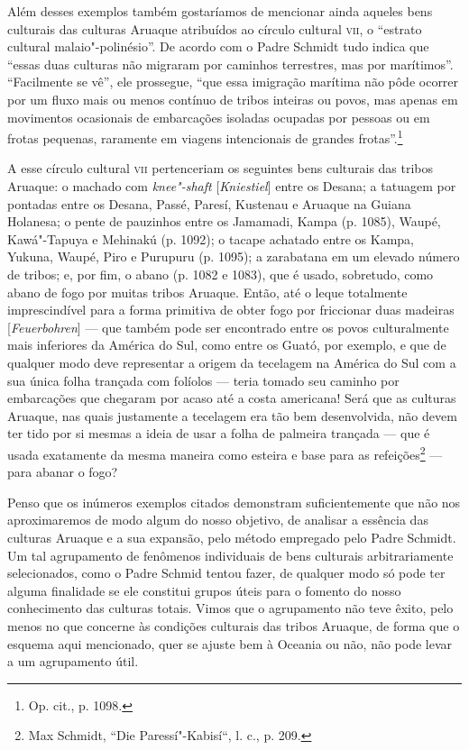 Além desses exemplos também gostaríamos de mencionar ainda aqueles bens
culturais das culturas Aruaque atribuídos ao círculo cultural \textsc{vii}, o
``estrato cultural malaio"-polinésio''. De acordo com o Padre Schmidt
tudo indica que ``essas duas culturas não migraram por caminhos
terrestres, mas por marítimos''. ``Facilmente se vê'', ele prossegue,
``que essa imigração marítima não pôde ocorrer por um fluxo mais ou
menos contínuo de tribos inteiras ou povos, mas apenas em movimentos
ocasionais de embarcações isoladas ocupadas por pessoas ou em frotas
pequenas, raramente em viagens intencionais de grandes
frotas''.\footnote{Op. cit., p. 1098.}

A esse círculo cultural \textsc{vii} pertenceriam os seguintes bens culturais das
tribos Aruaque: o machado com \emph{knee"-shaft} {[}\emph{Kniestiel}{]}
entre os Desana; a tatuagem por pontadas entre os Desana, Passé, Paresí,
Kustenau e Aruaque na Guiana Holanesa; o pente de pauzinhos entre os
Jamamadi, Kampa (p. 1085), Waupé, Kawá"-Tapuya e Mehinakú (p. 1092); o
tacape achatado entre os Kampa, Yukuna, Waupé, Piro e Purupuru (p.
1095); a zarabatana em um elevado número de tribos; e, por fim, o abano
(p. 1082 e 1083), que é usado, sobretudo, como abano de fogo por muitas
tribos Aruaque. Então, até o leque totalmente imprescindível para a
forma primitiva de obter fogo por friccionar duas madeiras
{[}\emph{Feuerbohren}{]} --- que também pode ser encontrado entre os
povos culturalmente mais inferiores da América do Sul, como entre os
Guató, por exemplo, e que de qualquer modo deve representar a origem da
tecelagem na América do Sul com a sua única folha trançada com folíolos
--- teria tomado seu caminho por embarcações que chegaram por acaso até a
costa americana! Será que as culturas Aruaque, nas quais justamente a
tecelagem era tão bem desenvolvida, não devem ter tido por si mesmas a
ideia de usar a folha de palmeira trançada --- que é usada exatamente da
mesma maneira como esteira e base para as refeições\footnote{Max
  Schmidt, ``Die Paressí"-Kabisí``, l. c., p. 209.} --- para abanar o
fogo?

Penso que os inúmeros exemplos citados demonstram suficientemente que
não nos aproximaremos de modo algum do nosso objetivo, de analisar a
essência das culturas Aruaque e a sua expansão, pelo método empregado
pelo Padre Schmidt. Um tal agrupamento de fenômenos individuais de bens
culturais arbitrariamente selecionados, como o Padre Schmid tentou
fazer, de qualquer modo só pode ter alguma finalidade se ele constitui
grupos úteis para o fomento do nosso conhecimento das culturas totais.
Vimos que o agrupamento não teve êxito, pelo menos no que concerne às
condições culturais das tribos Aruaque, de forma que o esquema aqui
mencionado, quer se ajuste bem à Oceania ou não, não pode levar a um
agrupamento útil.

